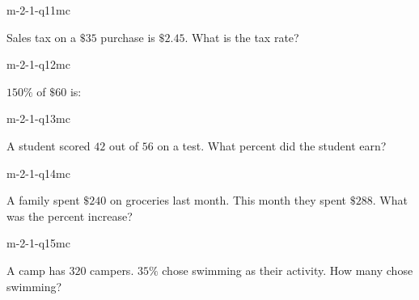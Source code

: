 \begin{practiceQuestion}{m-2-1-q11}{mc}
\begin{questionText}
Sales tax on a $\$35$ purchase is $\$2.45$. What is the tax rate?
\end{questionText}
\end{practiceQuestion}

\begin{practiceQuestion}{m-2-1-q12}{mc}
\begin{questionText}
$150\%$ of $\$60$ is:
\end{questionText}
\end{practiceQuestion}

\begin{practiceQuestion}{m-2-1-q13}{mc}
\begin{questionText}
A student scored $42$ out of $56$ on a test. What percent did the student earn?
\end{questionText}
\end{practiceQuestion}

\begin{practiceQuestion}{m-2-1-q14}{mc}
\begin{questionText}
A family spent $\$240$ on groceries last month. This month they spent $\$288$. What was the percent increase?
\end{questionText}
\end{practiceQuestion}

\begin{practiceQuestion}{m-2-1-q15}{mc}
\begin{questionText}
A camp has $320$ campers. $35\%$ chose swimming as their activity. How many chose swimming?
\end{questionText}
\end{practiceQuestion}


